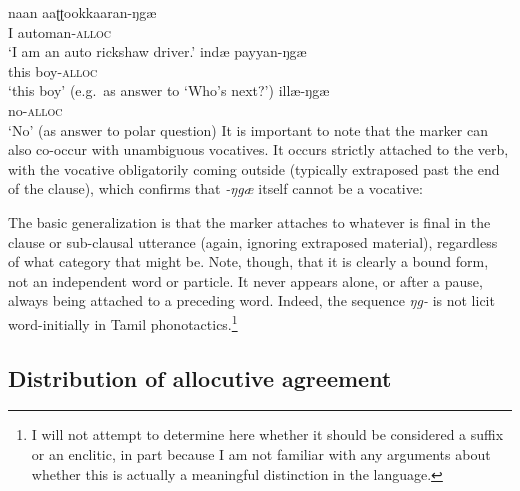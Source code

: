 \documentclass[output=paper, modfonts, nonflat]{langsci/langscibook}
\begin{document}
\ea\label{short}
 \ea\label{rajni}\gll naan aaʈʈookkaaran-ŋgæ\\
 I automan-\textsc{alloc}\\
 \glt `I am an auto rickshaw driver.'
 \ex\label{boy}\gll indæ{} payyan-ŋgæ\\
 this boy-\textsc{alloc}\\
 \glt `this boy' (e.g.\ as answer to `Who's next?')
 \ex\label{yes}\gll illæ-ŋgæ\\
 no-\textsc{alloc}\\
 \glt `No' (as answer to polar question)
 \z
\z
%
It is important to note that the \allagr{} marker can also co-occur
with unambiguous vocatives. It occurs strictly attached to the verb,
with the vocative obligatorily coming outside (typically extraposed
past the end of the clause), which confirms that \textit{-ŋgæ} itself
cannot be a vocative:

\ea\label{vocative}
 \z
\z
%
The basic generalization is that the marker attaches to whatever is
final in the clause or sub-clausal utterance (again, ignoring
extraposed material), regardless of what category that might be. Note,
though, that it is clearly a bound form, not an independent word or
particle. It never appears alone, or after a pause, always being
attached to a preceding word. Indeed, the sequence \textit{ŋg-} is
not licit word-initially in Tamil phonotactics.\footnote{I will not
  attempt to determine here whether it should be considered a suffix
  or an enclitic, in part because I am not familiar with any arguments
  about whether this is actually a meaningful distinction in the
  language.}

\subsection{Distribution of allocutive agreement}
\end{document}
